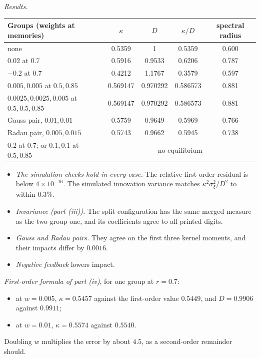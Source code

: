 \documentclass[12pt]{article}
\theoremstyle{definition}
\theoremstyle{remark}
\begin{document}
\emph{Results.}
\begin{center}\small
\begin{tabular}{lcccc}
\hline
Groups (weights at memories) & $\kappa$ & $D$ & $\kappa/D$ & spectral radius\\
\hline
none & 0.5359 & 1 & 0.5359 & 0.600\\
$0.02$ at $0.7$ & 0.5916 & 0.9533 & 0.6206 & 0.787\\
$-0.2$ at $0.7$ & 0.4212 & 1.1767 & 0.3579 & 0.597\\
$0.005,0.005$ at $0.5,0.85$ & 0.569147 & 0.970292 & 0.586573 & 0.881\\
$0.0025,0.0025,0.005$ at $0.5,0.5,0.85$ & 0.569147 & 0.970292 & 0.586573 & 0.881\\
Gauss pair, $0.01,0.01$ & 0.5759 & 0.9649 & 0.5969 & 0.766\\
Radau pair, $0.005,0.015$ & 0.5743 & 0.9662 & 0.5945 & 0.738\\
$0.2$ at $0.7$; or $0.1,0.1$ at $0.5,0.85$ & \multicolumn{4}{c}{no equilibrium}\\
\hline
\end{tabular}
\end{center}
\begin{itemize}[itemsep=1pt,topsep=2pt]
\item \emph{The simulation checks hold in every case.} The relative first-order residual is below $4\times10^{-16}$. The simulated innovation variance matches $\kappa^2\sigma_\xi^2/D^2$ to within $0.3\%$.
\item \emph{Invariance (part (iii)).} The split configuration has the same merged measure as the two-group one, and its coefficients agree to all printed digits.
\item \emph{Gauss and Radau pairs.} They agree on the first three kernel moments, and their impacts differ by $0.0016$.
\item \emph{Negative feedback} lowers impact.
\end{itemize}

\emph{First-order formula of part (iv)}, for one group at $r=0.7$:
\begin{itemize}[itemsep=1pt,topsep=2pt]
\item at $w=0.005$, $\kappa=0.5457$ against the first-order value $0.5449$, and $D=0.9906$ against $0.9911$;
\item at $w=0.01$, $\kappa=0.5574$ against $0.5540$.
\end{itemize}
Doubling $w$ multiplies the error by about $4.5$, as a second-order remainder should.
\end{document}
